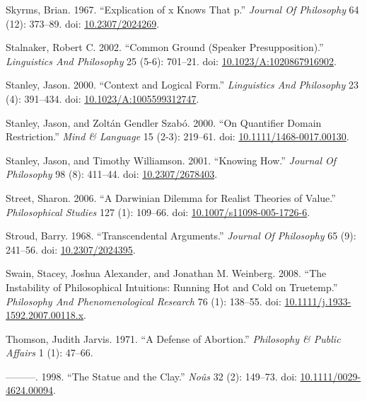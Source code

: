 \documentclass[
  10pt,
  letterpaper,
  DIV=11,
  numbers=noendperiod,
  twoside]{scrartcl}
\newlength{\cslhangindent}
\newenvironment{CSLReferences}[2] %
 {\begin{list}{}{%
  \setlength{\itemindent}{0pt}
  \setlength{\leftmargin}{0pt}
  \setlength{\parsep}{0pt}
  \ifodd #1
   \setlength{\leftmargin}{\cslhangindent}
   \setlength{\itemindent}{-1\cslhangindent}
  \fi
  \setlength{\itemsep}{#2\baselineskip}}}
 {\end{list}}
\begin{document}
\begin{CSLReferences}{1}{0}
Skyrms, Brian. 1967. {``Explication of x Knows That p.''} \emph{Journal
Of Philosophy} 64 (12): 373--89. doi:
\href{https://doi.org/10.2307/2024269}{10.2307/2024269}.

Stalnaker, Robert C. 2002. {``Common Ground (Speaker Presupposition).''}
\emph{Linguistics And Philosophy} 25 (5-6): 701--21. doi:
\href{https://doi.org/10.1023/A:1020867916902}{10.1023/A:1020867916902}.

Stanley, Jason. 2000. {``Context and Logical Form.''} \emph{Linguistics
And Philosophy} 23 (4): 391--434. doi:
\href{https://doi.org/10.1023/A:1005599312747}{10.1023/A:1005599312747}.

Stanley, Jason, and Zoltán Gendler Szabó. 2000. {``On Quantifier Domain
Restriction.''} \emph{Mind \& Language} 15 (2-3): 219--61. doi:
\href{https://doi.org/10.1111/1468-0017.00130}{10.1111/1468-0017.00130}.

Stanley, Jason, and Timothy Williamson. 2001. {``Knowing How.''}
\emph{Journal Of Philosophy} 98 (8): 411--44. doi:
\href{https://doi.org/10.2307/2678403}{10.2307/2678403}.

Street, Sharon. 2006. {``A Darwinian Dilemma for Realist Theories of
Value.''} \emph{Philosophical Studies} 127 (1): 109--66. doi:
\href{https://doi.org/10.1007/s11098-005-1726-6}{10.1007/s11098-005-1726-6}.

Stroud, Barry. 1968. {``Transcendental Arguments.''} \emph{Journal Of
Philosophy} 65 (9): 241--56. doi:
\href{https://doi.org/10.2307/2024395}{10.2307/2024395}.

Swain, Stacey, Joshua Alexander, and Jonathan M. Weinberg. 2008. {``The
Instability of Philosophical Intuitions: Running Hot and Cold on
Truetemp.''} \emph{Philosophy And Phenomenological Research} 76 (1):
138--55. doi:
\href{https://doi.org/10.1111/j.1933-1592.2007.00118.x}{10.1111/j.1933-1592.2007.00118.x}.

Thomson, Judith Jarvis. 1971. {``A Defense of Abortion.''}
\emph{Philosophy \& Public Affairs} 1 (1): 47--66.

---------. 1998. {``The Statue and the Clay.''} \emph{Noûs} 32 (2):
149--73. doi:
\href{https://doi.org/10.1111/0029-4624.00094}{10.1111/0029-4624.00094}.


\end{CSLReferences}
\end{document}

